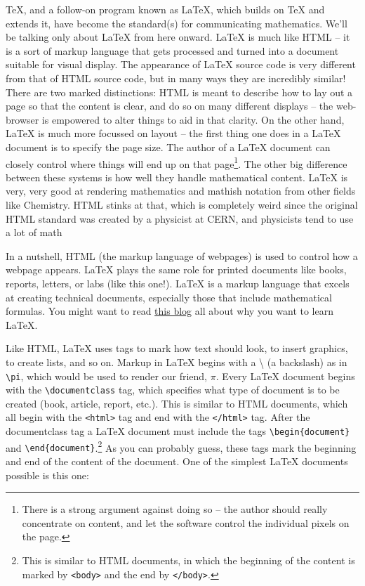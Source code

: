 \TeX{}, and a follow-on program known as \LaTeX{}, which builds on \TeX{} and extends it, have become the standard(s) for communicating mathematics.  We'll be talking only about \LaTeX{}  from here onward.  \LaTeX{} is much like HTML -- it is a sort of markup language that gets processed and turned into a document suitable for visual display.  The appearance of \LaTeX{} source code is very different from that of HTML source code, but in many ways they are incredibly similar!  There are two marked distinctions:  HTML is meant to describe how to lay out a page so that the content is clear, and do so on many different displays -- the web-browser is empowered to alter things to aid in that clarity. On the other hand, \LaTeX{} is much more focussed on layout -- the first thing one does in a \LaTeX{} document is to specify the page size.  The author of a \LaTeX{} document can closely control where things will end up on that page\footnote{There is a strong argument against doing so -- the author should really concentrate on content, and let the software control the individual pixels on the page.}.
The other big difference between these systems is how well they handle mathematical content.  \LaTeX{} is very, very good at rendering mathematics and mathish notation from other fields like Chemistry.  HTML stinks at that, which is completely weird since the original HTML standard was created by a physicist at CERN, and physicists tend to use a lot of math\textellipsis

In a nutshell, HTML (the markup language of webpages) is used to
control how a webpage appears. \LaTeX{} plays the same role for printed
documents like books, reports, letters, or labs (like this one!).
\LaTeX{}   is a markup language that excels at creating technical documents,
especially those that include mathematical formulas. You might want
to read \href{https://medium.com/swlh/the-students-guide-to-latex-markup-what-it-is-and-why-you-want-it-651e723ce0c8}{this blog}
all about why you want to learn \LaTeX{}.

Like HTML, \LaTeX{} uses tags to mark how text should look, to insert
graphics, to create lists, and so on. Markup in \LaTeX{}   begins with
a \textbackslash{} (a backslash) as in {\tt \textbackslash pi},
which would be used to render our friend, $\pi$. Every \LaTeX{}  
document begins with the {\tt \textbackslash documentclass} tag,
which specifies what type of document is to be created (book, article,
report, etc.).  This is similar to HTML documents, which all begin with the \verb+<html>+
tag and end with the \verb+</html>+ tag. After the documentclass tag a \LaTeX{}   document must include the
tags {\tt \textbackslash begin\{document\}} and {\tt \textbackslash end\{document\}}.\footnote{This is similar to HTML documents, in which the beginning of the content
is marked by {\tt <body>} and the end by {\tt </body>}.} As you can probably guess, these tags mark the beginning and end
of the content of the document. One of the simplest \LaTeX{} documents
possible is this one:

